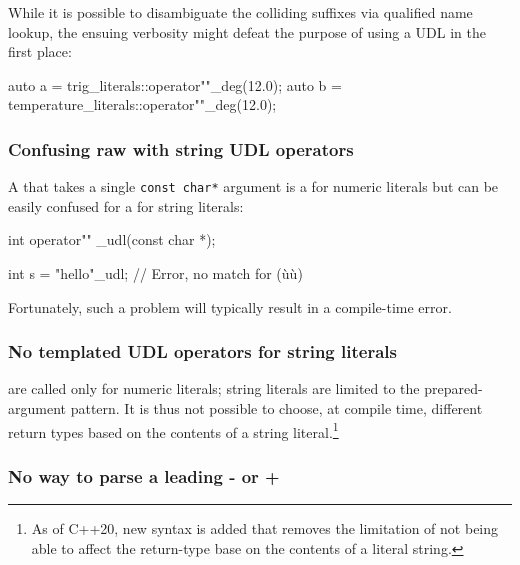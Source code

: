 \noindent While it is possible to disambiguate the colliding suffixes via qualified name lookup, the ensuing verbosity might defeat the purpose of using a UDL in the first place:

\begin{emcppslisting}[emcppsbatch=e25]
auto a = trig_literals::operator""_deg(12.0);
auto b = temperature_literals::operator""_deg(12.0);
\end{emcppslisting}


\subsubsection[Confusing raw with string UDL operators]{Confusing raw with string UDL operators}\label{easy-to-confuse-raw-with-string-udl-operators}

A  that takes a single
\lstinline!const!~\lstinline!char*! argument is a 
for numeric literals but can be easily confused for a
 for string literals:

\begin{emcppslisting}
int operator"" _udl(const char *);

int s = "hello"_udl;  // Error, no match for (ù{}ù)
\end{emcppslisting}

\noindent Fortunately, such a problem will typically result in a compile-time
error.

\subsubsection[No templated UDL operators for string literals]{No templated UDL operators for string literals}\label{no-templated-udl-operators-for-string-literals}

 are called only for numeric literals;
string literals are limited to the prepared-argument pattern. It is thus
not possible to choose, at compile time, different return types based on
the contents of a string literal.\footnote{As of C++20, new syntax is added that removes the limitation of not being able to affect the return-type base on the contents of a literal string.}

\subsubsection[No way to parse a leading \lstinline!-! or \lstinline!+!]{No way to parse a leading {\SubsubsecCode -} or {\SubsubsecCode +}}\label{no-way-to-parse-a-leading---or-+}

